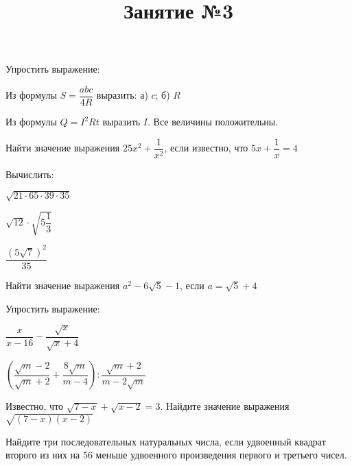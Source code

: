 \begin{listofex}
	\item Упростить выражение:
	\begin{enumcols}[itemcolumns=1]
		\item {}
		\item {}
	\end{enumcols}
	\item Из формулы \( S=\dfrac{abc}{4R} \) выразить: а) \( c \); б) \( R \)
	\item Из формулы \( Q=I^2Rt \) выразить \( I \). Все величины положительны.
	\item Найти значение выражения \( 25x^2+\dfrac{1}{x^2} \), если известно, что \( 5x+\dfrac{1}{x}=4 \)
	\item {}
	\item {}
	\item Вычислить:
	\begin{enumcols}[itemcolumns=3]
		\item \( \sqrt{21\cdot65\cdot39\cdot35} \)
		\item \( \sqrt{12}\cdot\sqrt{5\dfrac{1}{3}} \)
		\item \( \dfrac{(5\sqrt{7})^2}{35} \)
	\end{enumcols}
	\item Найти значение выражения \( a^2-6\sqrt{5}-1 \), если \( a=\sqrt{5}+4 \)
	\item Упростить выражение:
	\begin{enumcols}[itemcolumns=2]
		\item \( \dfrac{x}{x-16}-\dfrac{\sqrt{x}}{\sqrt{x}+4} \)
		\item \( \left( \dfrac{\sqrt{m}-2}{\sqrt{m}+2}+\dfrac{8\sqrt{m}}{m-4} \right):\dfrac{\sqrt{m}+2}{m-2\sqrt{m}} \)
	\end{enumcols}
	\item Известно, что \( \sqrt{7-x}+\sqrt{x-2}=3 \). Найдите значение выражения \( \sqrt{(7-x)(x-2)} \)
	\item Найдите три последовательных натуральных числа, если удвоенный квадрат второго из
	них на \( 56 \) меньше удвоенного произведения первого и третьего чисел.
\end{listofex}
\newpage
\title{Занятие №3}
